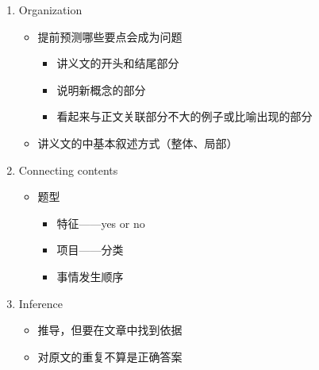 \documentclass[UTF8]{ctexart}
\begin{document}
\begin{enumerate}[A]
  \item Organization\\
  \begin{itemize}
    \item 提前预测哪些要点会成为问题
    \begin{itemize}
      \item 讲义文的开头和结尾部分
      \item 说明新概念的部分
      \item 看起来与正文关联部分不大的例子或比喻出现的部分
    \end{itemize}
    \item 讲义文的中基本叙述方式（整体、局部）
  \end{itemize}
  \item Connecting contents\\
  \begin{itemize}
    \item 题型
    \begin{itemize}
      \item 特征——yes or no
      \item 项目——分类
      \item 事情发生顺序
    \end{itemize}
  \end{itemize}
  \item Inference
  \begin{itemize}
    \item 推导，但要在文章中找到依据
    \item 对原文的重复不算是正确答案
  \end{itemize}
\end{enumerate}
\end{document}
